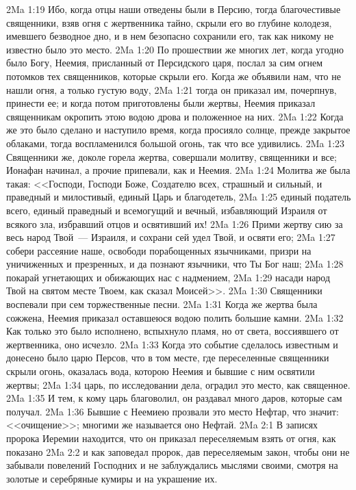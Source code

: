\vs 2Ma 1:19 Ибо, когда отцы наши отведены были в Персию, тогда благочестивые священники, взяв огня с жертвенника тайно, скрыли его во глубине колодезя, имевшего безводное дно, и в нем безопасно сохранили его, так как никому не известно было это место.
\rsbpar\vs 2Ma 1:20 По прошествии же многих лет, когда угодно было Богу, Неемия, присланный от Персидского царя, послал за сим огнем потомков тех священников, которые скрыли его. Когда же объявили нам, что не нашли огня, а только густую воду,
\vs 2Ma 1:21 тогда он приказал им, почерпнув, принести ее; и когда потом приготовлены были жертвы, Неемия приказал священникам окропить этою водою дрова и положенное на них.
\vs 2Ma 1:22 Когда же это было сделано и наступило время, когда просияло солнце, прежде закрытое облаками, тогда воспламенился большой огонь, так что все удивились.
\vs 2Ma 1:23 Священники же, доколе горела жертва, совершали молитву, священники и все; Ионафан начинал, а прочие припевали, как и Неемия.
\vs 2Ma 1:24 Молитва же была такая: <<Господи, Господи Боже, Создателю всех, страшный и сильный, и праведный и милостивый, единый Царь и благодетель,
\vs 2Ma 1:25 единый податель всего, единый праведный и всемогущий и вечный, избавляющий Израиля от всякого зла, избравший отцов и освятивший их!
\vs 2Ma 1:26 Прими жертву сию за весь народ Твой~--- Израиля, и сохрани сей удел Твой, и освяти его;
\vs 2Ma 1:27 собери рассеяние наше, освободи порабощенных язычниками, призри на уничиженных и презренных, и да познают язычники, что Ты Бог наш;
\vs 2Ma 1:28 покарай угнетающих и обижающих нас с надмением,
\vs 2Ma 1:29 насади народ Твой на святом месте Твоем, как сказал Моисей>>.
\vs 2Ma 1:30 Священники воспевали при сем торжественные песни.
\vs 2Ma 1:31 Когда же жертва была сожжена, Неемия приказал оставшеюся водою полить большие камни.
\vs 2Ma 1:32 Как только это было исполнено, вспыхнуло пламя, но от света, воссиявшего от жертвенника, оно исчезло.
\vs 2Ma 1:33 Когда это событие сделалось известным и донесено было царю Персов, что в том месте, где переселенные священники скрыли огонь, оказалась вода, которою Неемия и бывшие с ним освятили жертвы;
\vs 2Ma 1:34 царь, по исследовании дела, оградил это место, как священное.
\vs 2Ma 1:35 И тем, к кому царь благоволил, он раздавал много даров, которые сам получал.
\vs 2Ma 1:36 Бывшие с Неемиею прозвали это место Нефтар, что значит: <<очищение>>; многими же называется оно Нефтай.
\vs 2Ma 2:1 В записях пророка Иеремии находится, что он приказал переселяемым взять от огня, как показано
\vs 2Ma 2:2 и как заповедал пророк, дав переселяемым закон, чтобы они не забывали повелений Господних и не заблуждались мыслями своими, смотря на золотые и серебряные кумиры и на украшение их.
